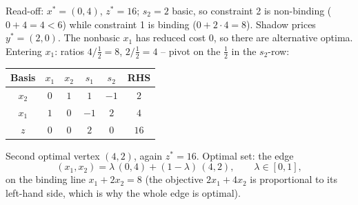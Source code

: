 \begin{solutions}
  \item Read-off: $x^{*}=(0,4)$, $z^{*}=16$; $s_{2}=2$ basic, so
        constraint 2 is non-binding ($0+4=4<6$) while constraint 1 is
        binding ($0+2\cdot 4=8$). Shadow prices $y^{*}=(2,0)$. The
        nonbasic $x_{1}$ has reduced cost $0$, so there are alternative
        optima. Entering $x_{1}$: ratios $4/\tfrac12=8$, $2/\tfrac12=4$ --
        pivot on the $\tfrac12$ in the $s_{2}$-row:
        \begin{center}
        \begin{tabular}{c|cccc|c}
        Basis & $x_{1}$ & $x_{2}$ & $s_{1}$ & $s_{2}$ & RHS\\
        \hline
        $x_{2}$ & $0$ & $1$ & $1$ & $-1$ & $2$\\
        $x_{1}$ & $1$ & $0$ & $-1$ & $2$ & $4$\\
        \hline
        $z$ & $0$ & $0$ & $2$ & $0$ & $16$\\
        \end{tabular}
        \end{center}
        Second optimal vertex $(4,2)$, again $z^{*}=16$. Optimal set: the
        edge
        \[
          (x_{1},x_{2})=\lambda\,(0,4)+(1-\lambda)\,(4,2),
          \qquad \lambda\in[0,1],
        \]
        on the binding line $x_{1}+2x_{2}=8$ (the objective
        $2x_{1}+4x_{2}$ is proportional to its left-hand side, which is
        why the whole edge is optimal).
\end{solutions}

